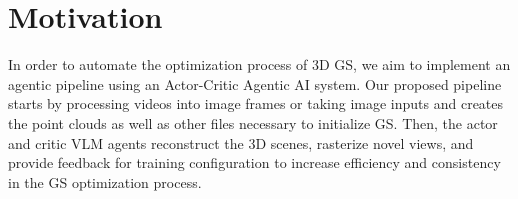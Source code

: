\section{Motivation}
\label{sec:motivation}

In order to automate the optimization process of 3D GS, we aim to implement an agentic pipeline using an Actor-Critic Agentic AI system. Our proposed pipeline starts by processing videos into image frames or taking image inputs and creates the point clouds as well as other files necessary to initialize GS. Then, the actor and critic VLM agents reconstruct the 3D scenes, rasterize novel views, and provide feedback for training configuration to increase efficiency and consistency in the GS optimization process.